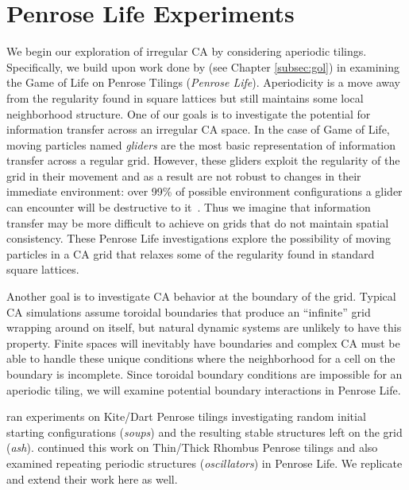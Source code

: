 \documentclass[a4paper,11pt]{report}
\begin{document}
\processdelayedfloats

\chapter{Penrose Life Experiments}
\label{ch:penrose}

We begin our exploration of irregular CA by considering aperiodic tilings. Specifically, we build upon work done by \citeauthor{hi05} (see Chapter \ref{subsec:gol}) in examining the Game of Life on Penrose Tilings (\textit{Penrose Life}). Aperiodicity is a move away from the regularity found in square lattices but still maintains some local neighborhood structure. 
One of our goals is to investigate the potential for information transfer across an irregular CA space. In the case of Game of Life, moving particles named \textit{gliders} are the most basic representation of information transfer across a regular grid. However, these gliders exploit the regularity of the grid in their movement and as a result are not robust to changes in their immediate environment: over 99\% of possible environment configurations a glider can encounter will be destructive to it~\cite{be14}. Thus we imagine that information transfer may be more difficult to achieve on grids that do not maintain spatial consistency. These Penrose Life investigations explore the possibility of moving particles in a CA grid that relaxes some of the regularity found in standard square lattices.     

Another goal is to investigate CA behavior at the boundary of the grid. Typical CA simulations assume toroidal boundaries that produce an ``infinite'' grid wrapping around on itself, but natural dynamic systems are unlikely to have this property. Finite spaces will inevitably have boundaries and complex CA must be able to handle these unique conditions where the neighborhood for a cell on the boundary is incomplete. Since toroidal boundary conditions are impossible for an aperiodic tiling, we will examine potential boundary interactions in Penrose Life.


\citeauthor{hi05} ran experiments on Kite/Dart Penrose tilings investigating random initial starting configurations (\textit{soups}) and the resulting stable structures left on the grid (\textit{ash}). \citeauthor{ow10} continued this work on Thin/Thick Rhombus Penrose tilings and also examined repeating periodic structures (\textit{oscillators}) in Penrose Life. We replicate and extend their work here as well.
\end{document}
